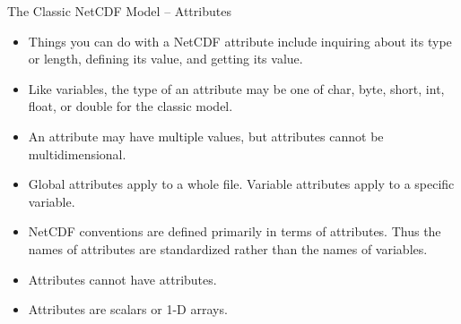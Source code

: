 \documentclass[compress,11pt,xcolor=svgnames,aspectratio=169]{beamer}
\begin{document}
\begin{frame}[fragile]{The Classic NetCDF Model -- Attributes}

\begin{itemize}
\setlength\itemsep{0.2cm}

  \item Things you can do with a NetCDF attribute include inquiring about its type or length, defining its value, and getting its value.
  \item Like variables, the type of an attribute may be one of char, byte, short, int, float, or double for the classic model.
  \item An attribute may have multiple values, but attributes cannot be multidimensional.
  \item Global attributes apply to a whole file. Variable attributes apply to a specific variable.
  \item NetCDF conventions are defined primarily in terms of attributes. Thus the names of attributes are standardized rather than the names of variables.
  \item Attributes cannot have attributes.
  \item Attributes are scalars or 1-D arrays.

\end{itemize}

\nocite{netcdf}

\end{frame}
\end{document}
